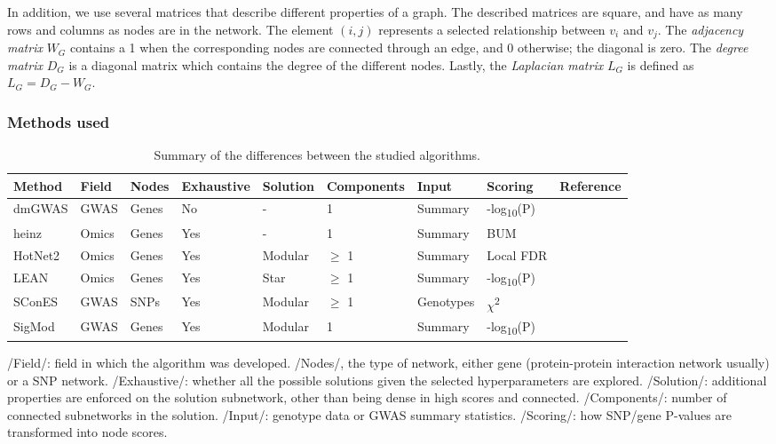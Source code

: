 \documentclass[twocolumn, 10pt]{article}
\begin{document}
In addition, we use several matrices that describe different properties of a graph. The described matrices are square, and have as many rows and columns as nodes are in the network. The element $(i,j)$ represents a  selected relationship between $v_i$ and $v_j$. The \emph{adjacency matrix} $W_G$ contains a 1 when the corresponding nodes are connected through an edge, and 0 otherwise; the diagonal is zero. The \emph{degree matrix} $D_G$ is a diagonal matrix which contains the degree of the different nodes. Lastly, the \emph{Laplacian matrix} $L_G$ is defined as $L_G = D_G - W_G$.

\subsubsection{Methods used}
\label{methods:methods}

\begin{table}[htbp]
  \begin{threeparttable}
    \caption{\label{tab:method_comparison}
      Summary of the differences between the studied algorithms.}
    \centering
    \begin{tabular}{l|lllllll}
      Method & Field & Nodes & Exhaustive & Solution & Components & Input & Scoring & Reference\\
      \hline
      dmGWAS & GWAS & Genes & No & - & 1 & Summary & -log\textsubscript{10}(P) & \cite{jia_dmgwas:_2011}\\
      heinz & Omics & Genes & Yes & - & 1 & Summary & BUM & \cite{dittrich_identifying_2008}\\
      HotNet2 & Omics & Genes & Yes & Modular & \(\ge\) 1 & Summary & Local FDR & \cite{leiserson_pan-cancer_2015}\\
      LEAN & Omics & Genes & Yes & Star & \(\ge\) 1 & Summary & -log\textsubscript{10}(P) & \cite{gwinner_network-based_2016}\\
      SConES & GWAS & SNPs & Yes & Modular & \(\ge\) 1 & Genotypes & \(\chi\)\textsuperscript{2} & \cite{azencott_efficient_2013}\\
      SigMod & GWAS & Genes & Yes & Modular & 1 & Summary & -log\textsubscript{10}(P) & \cite{liu_sigmod:_2017}\\
    \end{tabular}
    \begin{tablenotes}
      /Field/: field in which the algorithm was developed. /Nodes/, the type of network, either gene (protein-protein interaction network usually) or a SNP network. /Exhaustive/: whether all the possible solutions given the selected hyperparameters are explored. /Solution/: additional properties are enforced on the solution subnetwork, other than being dense in high scores and connected. /Components/: number of connected subnetworks in the solution. /Input/: genotype data or GWAS summary statistics. /Scoring/: how SNP/gene P-values are transformed into node scores.
    \end{tablenotes}
  \end{threeparttable}
\end{table}
\end{document}

